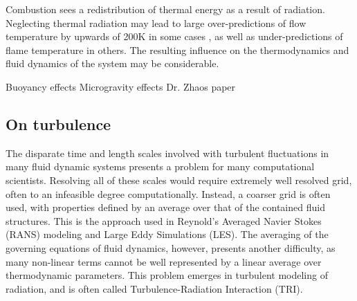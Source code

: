 Combustion sees a redistribution of thermal energy as a result of radiation. 
Neglecting thermal radiation may lead to large over-predictions of flow temperature by upwards of 200K in some cases \cite{Modest2016RadiativeSystems,Wu2021LimitationsFires,Coelho2018RadiativeSystems}, as well as under-predictions of flame temperature in others. The resulting influence on the thermodynamics and fluid dynamics of the system may be considerable.

Buoyancy effects
Microgravity effects
Dr. Zhaos paper



\subsection{On turbulence}

The disparate time and length scales involved with turbulent fluctuations in many fluid dynamic systems presents a problem for many computational scientists.
Resolving all of these scales would require extremely well resolved grid, often to an infeasible degree computationally. 
Instead, a coarser grid is often used, with properties defined by an average over that of the contained fluid structures. This is the approach used in Reynold's Averaged Navier Stokes (RANS) modeling and Large Eddy Simulations (LES).
The averaging of the governing equations of fluid dynamics, however, presents another difficulty, as many non-linear terms cannot be well represented by a linear average over thermodynamic parameters.
This problem emerges in turbulent modeling of radiation, and is often called Turbulence-Radiation Interaction (TRI).

